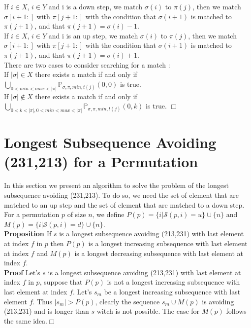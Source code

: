 \documentclass[12pt, a4paper]{article}
\newcommand{\ptext}{\pi}
\newcommand{\pmotif}{\sigma}
\newcommand{\x}{X}
\newcommand{\y}{Y}
\newcounter{num}
\newcommand{\numl}[1]{\refstepcounter{num}\label{#1}}
\newcommand{\dstep}{d}
\newcommand{\ustep}{u}
\begin{document}
			If $i \in \x$, $i \in \y$ and i is a down step,
			we match $\pmotif(i)$ to $\ptext(j)$, 
			then we match $\pmotif[i+1:]$ with $\ptext[j+1:]$
			with the condition that
			$\pmotif(i+1)$ is matched to $\ptext(j+1)$,
			and that $\ptext(j+1)=\pmotif(i)-1$.\\			

			If $i \in \x$, $i \in \y$ and i is an up step,
			we match $\pmotif(i)$ to $\ptext(j)$, 
			then we match $\pmotif[i+1:]$ with $\ptext[j+1:]$
			with the condition that
			$\pmotif(i+1)$ is matched to $\ptext(j+1)$,
			and that $\ptext(j+1)=\pmotif(i)+1$.\\		
					
			There are two cases to consider searching for a match : \\
			If $|\pmotif| \in \x$ there exists a match
			if and only if\\ $\bigcup_{0<min<max<|\ptext|}\mathbb{P}_{\pmotif,\ptext,min,t(j)}(0,0)$ is true.\\
			
			If $|\pmotif| \notin \x$ there exists a match if and only if \\	$\bigcup_{0<k<|\ptext|,0<min<max<|\ptext|}\mathbb{P}_{\pmotif,\ptext,min,t(j)}(0,k)$
			is true. $\Box$  			
	
	\section{Longest Subsequence Avoiding \\(231,213) for a Permutation}

	In this section we present an algorithm to solve the problem
	of the longest subsequence avoiding (231,213).
	To do so, we need the set of element
	that are matched to an up step and the
	set of element that are matched to a down step.
	For a permutation $p$ of size $n$, we define
	$P(p) = \{i | \mathcal{S}(p,i) = \ustep \} \cup \{n\}$ and  
	$M(p) = \{i | \mathcal{S}(p,i) = \dstep \} \cup \{n\}$.\\
	
	\textbf{Proposition  \numl{longestIncreasingSubsequence} \thenum}
	If $s$ is a longest subsequence avoiding (213,231) with last element at index $f$ in $p$ then
	$P(p)$ is a longest increasing subsequence with last element at index $f$ and
	$M(p)$ is a longest decreasing subsequence with last element at index $f$.\\

	
	\textbf{Proof} Let's $s$ is a longest subsequence avoiding (213,231) with last element at index $f$ in $p$, 
	suppose that $P(p)$ is not a longest increasing subsequence with last element at index $f$. Let's $s_m$ be a longest increasing subsequence with last element $f$.
	Thus $|s_m|>P(p)$, clearly the sequence $s_m \cup M(p)$
	is avoiding (213,231) and is longer than $s$ witch is not possible. 
	The case for $M(p)$ follows the same idea.$\Box$\\
\end{document}
